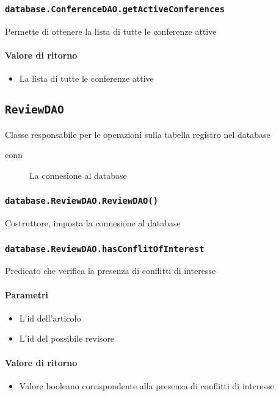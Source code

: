 \subsubsection{\texttt{database.ConferenceDAO.getActiveConferences}}
Permette di ottenere la lista di tutte le conferenze attive
\paragraph{Valore di ritorno}
\begin{itemize}
\item La lista di tutte le conferenze attive
\end{itemize}


\subsection{\texttt{ReviewDAO}}
Classe responsabile per le operazioni sulla tabella registro nel database
\begin{description}
\item[conn] La connesione al database
\end{description}

\subsubsection{\texttt{database.ReviewDAO.ReviewDAO()}}
Costruttore, imposta la connesione al database

\subsubsection{\texttt{database.ReviewDAO.hasConflitOfInterest}}
Predicato che verifica la presenza di conflitti di interesse
\paragraph{Parametri}
\begin{itemize}
\item L'id dell'articolo
\item L'id del possibile revisore
\end{itemize}
\paragraph{Valore di ritorno}
\begin{itemize}
\item Valore booleano corrispondente alla presenza di conflitti di interesse
\end{itemize}

